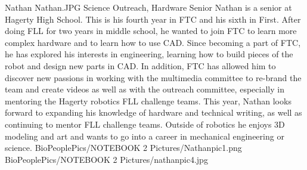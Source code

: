 \insertbio
{Nathan}
{Nathan.JPG}
{Science}
{Outreach, Hardware}
{Senior}
{
Nathan is a senior at Hagerty High School. This is his fourth year in FTC and his sixth in First. After doing FLL for two years in middle school, he wanted to join FTC to learn more complex hardware and to learn how to use CAD. Since becoming a part of FTC, he has explored his interests in engineering, learning how to build pieces of the robot and design new parts in CAD. In addition, FTC has allowed him to discover new passions in working with the multimedia committee to re-brand the team and create videos as well as with the outreach committee, especially in mentoring the Hagerty robotics FLL challenge teams. This year, Nathan looks forward to expanding his knowledge of hardware and technical writing, as well as continuing to mentor FLL challenge teams. Outside of robotics he enjoys 3D modeling and art and wants to go into a career in mechanical engineering or science.
}
{BioPeoplePics/NOTEBOOK 2 Pictures/Nathanpic1.png}
{BioPeoplePics/NOTEBOOK 2 Pictures/nathanpic4.jpg}
